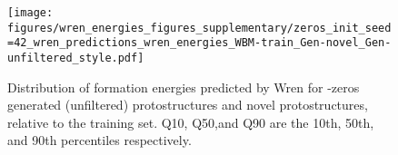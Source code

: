 \begin{figure}[t!]
    \centering

    \texttt{[image: figures/wren\_energies\_figures\_supplementary/zeros\_init\_seed=42\_wren\_predictions\_wren\_energies\_WBM-train\_Gen-novel\_Gen-unfiltered\_style.pdf]}
    \caption{Distribution of formation energies predicted by Wren for \ourmodel-zeros generated (unfiltered) protostructures and novel protostructures, relative to the training set. Q10, Q50,and  Q90 are the 10th, 50th, and 90th percentiles respectively.}
    \label{fig:wren-energies}
\end{figure}

